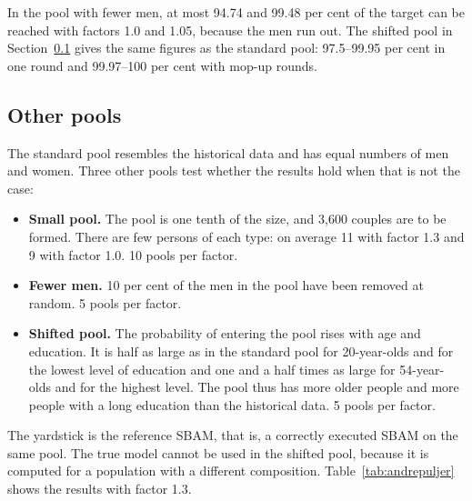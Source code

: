 \documentclass[12pt,a4paper]{article}
\begin{document}
In the pool with fewer men, at most 94.74 and 99.48 per cent of the target can be reached with
factors 1.0 and 1.05, because the men run out. The shifted pool in Section~\ref{sec:andrepuljer}
gives the same figures as the standard pool: 97.5--99.95 per cent in one round and 99.97--100 per
cent with mop-up rounds.

\subsection{Other pools}\label{sec:andrepuljer}

The standard pool resembles the historical data and has equal numbers of men and women. Three other
pools test whether the results hold when that is not the case:

\begin{itemize}
\item \textbf{Small pool.} The pool is one tenth of the size, and 3,600 couples are to be formed.
There are few persons of each type: on average 11 with factor 1.3 and 9 with factor 1.0. 10 pools
per factor.
\item \textbf{Fewer men.} 10 per cent of the men in the pool have been removed at random. 5 pools
per factor.
\item \textbf{Shifted pool.} The probability of entering the pool rises with age and education. It
is half as large as in the standard pool for 20-year-olds and for the lowest level of education and
one and a half times as large for 54-year-olds and for the highest level. The pool thus has more
older people and more people with a long education than the historical data. 5 pools per factor.
\end{itemize}

The yardstick is the reference SBAM, that is, a correctly executed SBAM on the same pool. The true
model cannot be used in the shifted pool, because it is computed for a population with a different
composition. Table~\ref{tab:andrepuljer} shows the results with factor 1.3.
\end{document}
